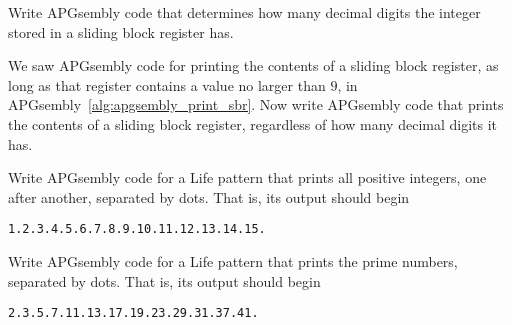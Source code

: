 \begin{multicols}{2}
	
	\mfilbreak
	
	
	\begin{problem}\label{exer:universal_computation_determine_digits} 
		Write APGsembly code that determines how many decimal digits the integer stored in a sliding block register has.
	\end{problem}
	
	
	\mfilbreak
	
	
	\begin{problem}\label{exer:universal_computation_print_register} 
		We saw APGsembly code for printing the contents of a sliding block register, as long as that register contains a value no larger than $9$, in APGsembly~\ref{alg:apgsembly_print_sbr}. Now write APGsembly code that prints the contents of a sliding block register, regardless of how many decimal digits it has.
		
	\end{problem}
	
	
	\mfilbreak
	
	
	\begin{problem}\label{exer:universal_computation_print_integers} 
		Write APGsembly code for a Life pattern that prints all positive integers, one after another, separated by dots. That is, its output should begin
		\begin{center}
			\texttt{1.2.3.4.5.6.7.8.9.10.11.12.13.14.15.}
		\end{center}
		
	\end{problem}
	
	
	\mfilbreak
	
	
	\begin{problem}\label{exer:universal_computation_print_prime} 
		Write APGsembly code for a Life pattern that prints the prime numbers, separated by dots. That is, its output should begin
		\begin{center}
			\texttt{2.3.5.7.11.13.17.19.23.29.31.37.41.}
		\end{center}
		
	\end{problem}
	

\end{multicols}
